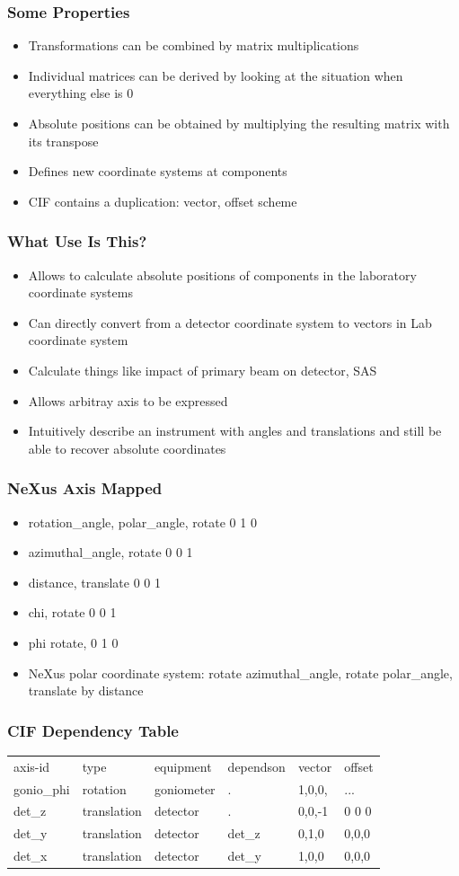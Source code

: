 \documentclass{beamer}
\begin{document}
\begin{frame} \frametitle{Some Properties}
\begin{itemize}
\item Transformations can be combined by matrix multiplications
\item Individual matrices can be derived by looking at the situation when everything else is 0
\item Absolute positions can be obtained by multiplying the resulting matrix with its transpose
\item Defines new coordinate systems at components
\item CIF contains a duplication: vector, offset scheme 
\end{itemize}
\end{frame}

\begin{frame} \frametitle{What Use Is This?}
\begin{itemize}
\item Allows to calculate absolute positions of components in the laboratory coordinate systems
\item Can directly convert from a detector coordinate system to  
 vectors in Lab coordinate system
\item Calculate things like impact of primary beam on detector, SAS
\item Allows arbitray axis to be expressed
\item Intuitively describe an instrument with angles and translations and still be able
 to recover absolute coordinates
\end{itemize}
\end{frame}


\begin{frame} \frametitle{NeXus Axis Mapped}
\begin{itemize}
\item rotation\_angle, polar\_angle, rotate 0 1 0
\item azimuthal\_angle, rotate 0 0 1
\item distance, translate 0 0  1
\item chi, rotate 0 0 1
\item phi rotate, 0 1 0
\item NeXus polar coordinate system: rotate azimuthal\_angle, rotate polar\_angle, 
 translate by distance
\end{itemize}
\end{frame}

\begin{frame} \frametitle{CIF Dependency Table}
\begin{tabular}{llllll}
axis-id &type &equipment&dependson &vector & offset\\
gonio\_phi &rotation& goniometer & . &1,0,0,& ...\\
det\_z&translation&detector& .& 0,0,-1& 0 0 0\\
det\_y&translation&detector&det\_z&0,1,0&0,0,0\\
det\_x&translation&detector&det\_y&1,0,0&0,0,0\\
\end{tabular}
\end{frame}
\end{document}
